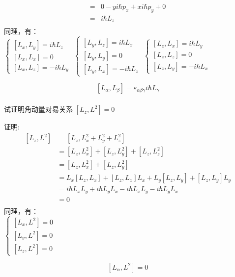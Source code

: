 \begin{frame} [allowframebreaks=]
\begin{equation*}
\begin{split}
        =&0-yi\hbar p_x+x i\hbar p_y+0\\
        =&i\hbar L_z\\
    \end{split}  
    \end{equation*}
    同理，有：\\
    $\begin{cases}
        [L_x,L_y]= i\hbar L_z  \\ 
        [L_x,L_x]= 0  \\ 
        [L_x,L_z]= -i\hbar L_y 
    \end{cases}$
    $\begin{cases}
        [L_y,L_z]= i\hbar L_x  \\ 
        [L_y,L_y]= 0  \\ 
        [L_y,L_x]= -i\hbar L_z 
    \end{cases}$
    $\begin{cases}
        [L_z,L_x]= i\hbar L_y  \\ 
        [L_z,L_z]= 0  \\ 
        [L_z,L_y]= -i\hbar L_x 
    \end{cases}$
    \begin{tcolorbox}[colback=yellow!5,colframe=red!75!black,title=角动量对易关系]
        $$ [L_\alpha,L_\beta]= \varepsilon_{\alpha\beta\gamma} i\hbar L_\gamma $$ 
    \end{tcolorbox}
\end{frame} 

\begin{frame} [allowframebreaks=]
    \frametitle{}
    \begin{exampleblock}{}
     试证明角动量对易关系 $[L_z,L^2]=0$
    \end{exampleblock}
    \alert{证明:} 
    \begin{equation*}
        \begin{split}
        [L_z,L^2]&= [L_z,L_x ^2+L_y ^2+L_z ^2]\\
        &=[L_z,L_x ^2]+[L_z,L_y ^2]+[L_z,L_z ^2]\\
        &=[L_z,L_x ^2]+[L_z,L_y ^2]\\
        &=L_x[L_z,L_x] +[L_z,L_x]L_x +L_y[L_z,L_y] +[L_z,L_y]L_y\\
        &=i\hbar L_x L_y +i\hbar L_yL_x - i\hbar L_x L_y -i\hbar L_yL_x\\
        &=0 \\
        \end{split}  
    \end{equation*}
    同理，有：\\
    $\begin{cases}
        [L_x,L^2]= 0  \\ 
        [L_y,L^2]= 0  \\ 
        [L_z,L^2]= 0 
    \end{cases}$
    \begin{tcolorbox}[colback=yellow!5,colframe=red!75!black,title=角动量对易关系]
        $$ [L_\alpha,L^2]= 0 $$ 
    \end{tcolorbox}
\end{frame} 

